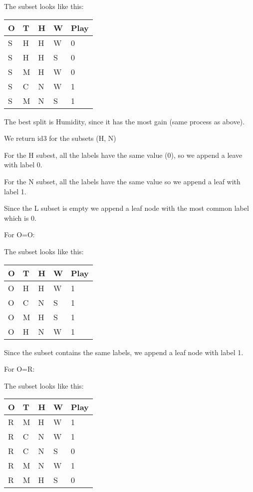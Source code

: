 \documentclass[12pt, fullpage,letterpaper]{article}
\begin{document}
\begin{enumerate}
\begin{enumerate}
The subset looks like this:

\begin{tabular}{|l|l|l|l|l|}
	\hline
	O & T & H & W & Play \\ \hline
	S & H & H & W & 0    \\ \hline
	S & H & H & S & 0    \\ \hline
	S & M & H & W & 0    \\ \hline
	S & C & N & W & 1    \\ \hline
	S & M & N & S & 1    \\ \hline
	\end{tabular}

The best split is Humidity, since it has the most gain (same process as above).

We return id3 for the subsets (H, N)

For the H subest, all the labels have the same value (0), so we append a leave with label 0.

For the N subset, all the labels have the same value so we append a leaf with label 1.

Since the L subset is empty  we append a leaf node with the most common label which is 0. 

For O=O:

The subset looks like this:

\begin{tabular}{|l|l|l|l|l|}
	\hline
	O & T & H & W & Play \\ \hline
	O & H & H & W & 1    \\ \hline
	O & C & N & S & 1    \\ \hline
	O & M & H & S & 1    \\ \hline
	O & H & N & W & 1    \\ \hline
	\end{tabular}


Since the subset contains the same labels, we append a leaf node with label 1.

For O=R:

The subset looks like this:

\begin{tabular}{|l|l|l|l|l|}
	\hline
	O & T & H & W & Play \\ \hline
	R & M & H & W & 1    \\ \hline
	R & C & N & W & 1    \\ \hline
	R & C & N & S & 0    \\ \hline
	R & M & N & W & 1    \\ \hline
	R & M & H & S & 0    \\ \hline
	\end{tabular}



\end{enumerate}
\end{enumerate}
\end{document}
